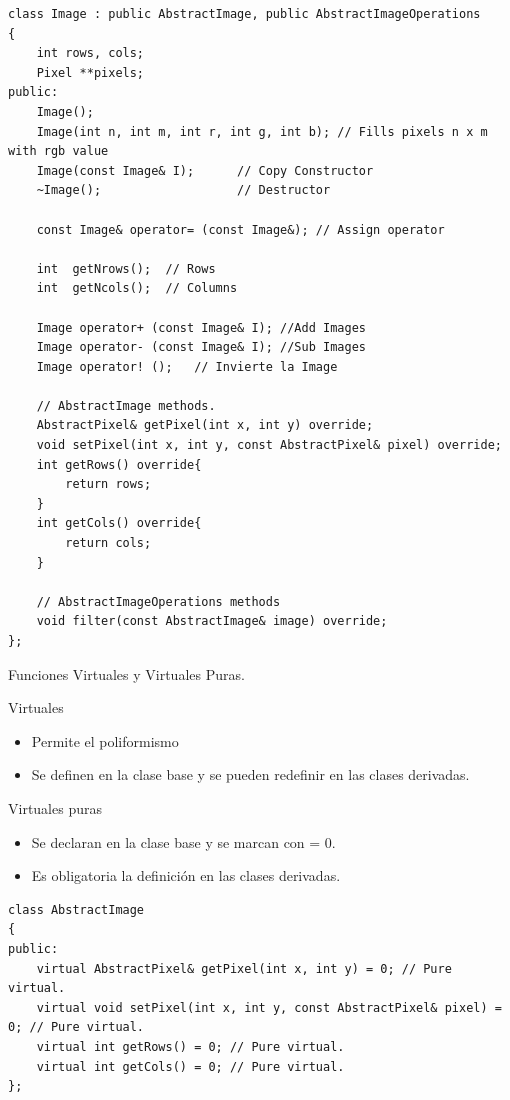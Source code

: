 \documentclass[aspectratio=169,presentation]{beamer}
\begin{document}
\begin{frame}[label={sec:org3d4973b},fragile]{}
 \begin{verbatim}
class Image : public AbstractImage, public AbstractImageOperations
{
	int rows, cols;
	Pixel **pixels;
public:
	Image();
	Image(int n, int m, int r, int g, int b); // Fills pixels n x m with rgb value
	Image(const Image& I);      // Copy Constructor
	~Image();                   // Destructor
	
	const Image& operator= (const Image&); // Assign operator
	
	int  getNrows();  // Rows
	int  getNcols();  // Columns
	
	Image operator+ (const Image& I); //Add Images
	Image operator- (const Image& I); //Sub Images
	Image operator! ();   // Invierte la Image
	
	// AbstractImage methods.
	AbstractPixel& getPixel(int x, int y) override;
	void setPixel(int x, int y, const AbstractPixel& pixel) override;
	int getRows() override{
		return rows;
	}
	int getCols() override{
		return cols;
	}
	
	// AbstractImageOperations methods
	void filter(const AbstractImage& image) override;
};
\end{verbatim}
\end{frame}
\begin{frame}[label={sec:orgc9339fb},fragile]{Funciones Virtuales y Virtuales Puras.}
 \begin{block}{Virtuales}
\begin{itemize}
\item Permite el poliformismo
\item Se definen en la clase base y se pueden redefinir en las clases derivadas.
\end{itemize}
\end{block}
\begin{block}{Virtuales puras}
\begin{itemize}
\item Se declaran en la clase base y se marcan con = 0.
\item Es obligatoria la definición en las clases derivadas.
\end{itemize}
\end{block}
\begin{block}{}
\begin{verbatim}
class AbstractImage
{
public:
	virtual AbstractPixel& getPixel(int x, int y) = 0; // Pure virtual.
	virtual void setPixel(int x, int y, const AbstractPixel& pixel) = 0; // Pure virtual.
	virtual int getRows() = 0; // Pure virtual.
	virtual int getCols() = 0; // Pure virtual.
};
\end{verbatim}
\end{block}
\end{frame}
\end{document}
